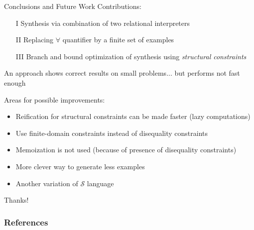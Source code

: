 \documentclass[aspectratio=169
  , xcolor={svgnames}
  , hyperref={ colorlinks,citecolor=Blue
             , linkcolor=DarkRed,urlcolor=DarkBlue}
  , russian
  ]{beamer}
\newcommand{\ir}{\ensuremath{\mathcal{S}}}
\newcommand{\contributions}{
\begin{enumerate}
\item[I] Synthesis via combination of two relational interpreters
\item[II] Replacing $\forall$ quantifier by a finite set of examples
\item[III] Branch and bound optimization of synthesis using \emph{structural constraints}
\end{enumerate}
}
\begin{document}
\begin{frame}{Conclusions and Future Work}
Contributions: \contributions
\vspace{1em}

An approach shows correct results on small problems...
 but performs not fast enough\\
\vspace{1em}
 
Areas for possible improvements:
\begin{itemize}
\item Reification for structural constraints can be made faster (lazy computations)
\item Use finite-domain constraints instead of disequality constraints 
\item Memoization is not used (because of presence of disequality constraints)
\item More clever way to generate less examples
\item Another variation of \ir{} language
\end{itemize}
\vspace{1em}\pause
\begin{center}
{\Huge Thanks!}
\end{center}

\end{frame}


\begin{frame}%
\frametitle{References}


\vspace{1cm}
\end{frame}
\end{document}
